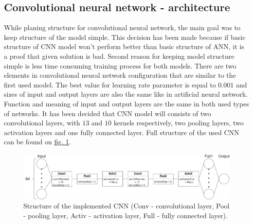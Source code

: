 \subsection{Convolutional neural network - architecture}\label{sec:cnn-architecture}
While planing structure for convolutional neural network, the main goal was to keep structure of the model simple. This decision has been made because if basic structure of CNN model won't perform better than basic structure of ANN, it is a proof that given solution is bad. Second reason for keeping model structure simple is less time consuming training process for both models. There are two elements in convolutional neural network configuration that are similar to the first used model. The best value for learning rate parameter is equal to $0.001$ and sizes of input and output layers are also the same like in artificial neural network. Function and meaning of input and output layers are the same in both used types of networks. It has been decided that CNN model will consists of two convolutional layers, with $13$ and $10$ kernels respectively, two pooling layers, two activation layers and one fully connected layer. Full structure of the used CNN can be found on \hyperref[fig:cnn-structure]{fig. \ref*{fig:cnn-structure}}.
\begin{figure}
	\centering
	\includegraphics[width=\textwidth]{dependencies/pictures/CNN_Structure.png}
	\caption{Structure of the implemented CNN (Conv - convolutional layer, Pool - pooling layer, Activ - activation layer, Full - fully connected layer).}
	\label{fig:cnn-structure}
\end{figure}
